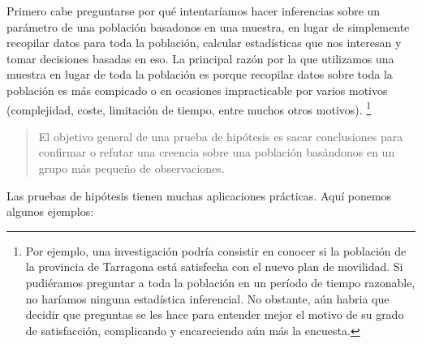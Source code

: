 \documentclass[
]{book}
\begin{document}
Primero cabe preguntarse por qué intentaríamos hacer inferencias sobre un parámetro de una población basadonos en una muestra, en lugar de simplemente recopilar datos para toda la población, calcular estadísticas que nos interesan y tomar decisiones basadas en eso. La principal razón por la que utilizamos una muestra en lugar de toda la población es porque recopilar datos sobre toda la población es más compicado o en ocasiones impracticable por varios motivos (complejidad, coste, limitación de tiempo, entre muchos otros motivos). \footnote{Por ejemplo, una investigación podría consistir en conocer si la población de la provincia de Tarragona está satisfecha con el nuevo plan de movilidad. Si pudiéramos preguntar a toda la población en un período de tiempo razonable, no haríamos ninguna estadística inferencial. No obstante, aún habria que decidir que preguntas se les hace para entender mejor el motivo de su grado de satisfacción, complicando y encareciendo aún más la encuesta.}

\begin{quote}
El objetivo general de una prueba de hipótesis es sacar conclusiones para confirmar o refutar una creencia sobre una población basándonos en un grupo más pequeño de observaciones.
\end{quote}

Las pruebas de hipótesis tienen muchas aplicaciones prácticas. Aquí ponemos algunos ejemplos:
\end{document}
